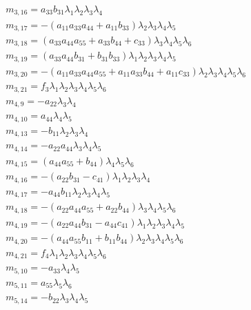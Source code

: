 \documentclass{article}
\begin{document}
\begin{align*}
&m_{3,16}=a_{33} b_{31} \lambda_{1} \lambda_{2} \lambda_{3} \lambda_{4}\\
&m_{3,17}=-{\left(a_{11} a_{33} a_{44} + a_{11} b_{33}\right)} \lambda_{2} \lambda_{3} \lambda_{4} \lambda_{5}\\
&m_{3,18}={\left(a_{33} a_{44} a_{55} + a_{33} b_{44} + c_{33}\right)} \lambda_{3} \lambda_{4} \lambda_{5} \lambda_{6}\\
&m_{3,19}={\left(a_{33} a_{44} b_{31} + b_{31} b_{33}\right)} \lambda_{1} \lambda_{2} \lambda_{3} \lambda_{4} \lambda_{5}\\
&m_{3,20}=-{\left(a_{11} a_{33} a_{44} a_{55} + a_{11} a_{33} b_{44} + a_{11} c_{33}\right)} \lambda_{2} \lambda_{3} \lambda_{4} \lambda_{5} \lambda_{6}\\
&m_{3,21}=f_{3} \lambda_{1} \lambda_{2} \lambda_{3} \lambda_{4} \lambda_{5} \lambda_{6}\\
&m_{4,9}=-a_{22} \lambda_{3} \lambda_{4}\\
&m_{4,10}=a_{44} \lambda_{4} \lambda_{5}\\
&m_{4,13}=-b_{11} \lambda_{2} \lambda_{3} \lambda_{4}\\
&m_{4,14}=-a_{22} a_{44} \lambda_{3} \lambda_{4} \lambda_{5}\\
&m_{4,15}={\left(a_{44} a_{55} + b_{44}\right)} \lambda_{4} \lambda_{5} \lambda_{6}\\
&m_{4,16}=-{\left(a_{22} b_{31} - c_{41}\right)} \lambda_{1} \lambda_{2} \lambda_{3} \lambda_{4}\\
&m_{4,17}=-a_{44} b_{11} \lambda_{2} \lambda_{3} \lambda_{4} \lambda_{5}\\
&m_{4,18}=-{\left(a_{22} a_{44} a_{55} + a_{22} b_{44}\right)} \lambda_{3} \lambda_{4} \lambda_{5} \lambda_{6}\\
&m_{4,19}=-{\left(a_{22} a_{44} b_{31} - a_{44} c_{41}\right)} \lambda_{1} \lambda_{2} \lambda_{3} \lambda_{4} \lambda_{5}\\
&m_{4,20}=-{\left(a_{44} a_{55} b_{11} + b_{11} b_{44}\right)} \lambda_{2} \lambda_{3} \lambda_{4} \lambda_{5} \lambda_{6}\\
&m_{4,21}=f_{4} \lambda_{1} \lambda_{2} \lambda_{3} \lambda_{4} \lambda_{5} \lambda_{6}\\
&m_{5,10}=-a_{33} \lambda_{4} \lambda_{5}\\
&m_{5,11}=a_{55} \lambda_{5} \lambda_{6}\\
&m_{5,14}=-b_{22} \lambda_{3} \lambda_{4} \lambda_{5}\\
\end{align*}
\end{document}
